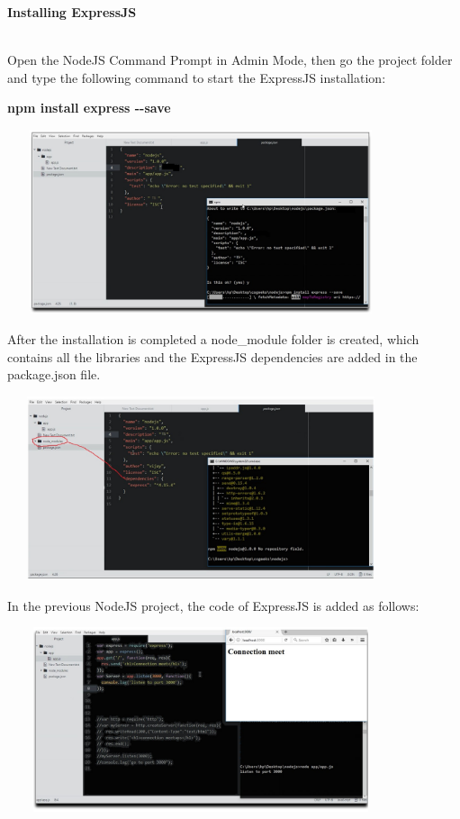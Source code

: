 \documentclass[
]{article}
\author{}
\date{}
\begin{document}
{\textbf{Installing ExpressJS}}

{\textbf{}}\strut \\

Open the NodeJS Command Prompt in Admin Mode, then go the project folder
and type the following command to start the ExpressJS installation:

\hfill    

\textbf{npm install express -\/-save}

\begin{center}
	 \includegraphics*[width=4.48in, height=2.13in]{IMG-01-01}
\end{center}


After the installation is completed a node\_module folder is created,
which contains all the libraries and the ExpressJS dependencies are
added in the package.json file.

\begin{center}
	\includegraphics*[width=4.48in, height=2.13in]{IMG-01-02}
\end{center}

In the previous NodeJS project, the code of ExpressJS is added as
follows:

\begin{center}
	\includegraphics*[width=4.48in, height=2.13in]{IMG-01-03}
\end{center}
\end{document}
